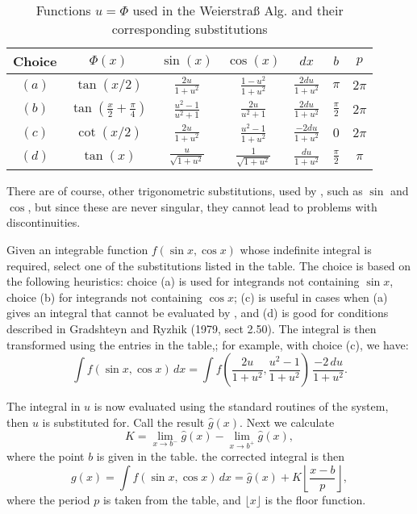 \begin{table}[htbp]
\begin{tabular}{|c|c|c|c|c|c|c|} \hline
Choice & $\Phi(x)$ & $\sin(x)$ & $\cos(x)$ & $dx$ & $b$ & $p$ \\ \hline
$(a)$ & $\tan(x/2)$ & $\frac{2u}{1+u^{2}}$ & $ \frac{1-u^{2}}{1+u^{2}}$ & $\frac{2du}{1+u^{2}}$ & $\pi$ & $2\pi$ \\ \hline
$(b)$ & $\tan(\frac{x}{2}+\frac{\pi}{4})$ & $\frac{u^{2}-1}{u^{2}+1}$ & $\frac{2u}{u^{2}+1} $ & $\frac{2du}{1+u^{2}}$ & $\frac{\pi}{2}$ & $2\pi$ \\ \hline
$(c)$ & $\cot(x/2)$ & $\frac{2u}{1+u^{2}}$ & $\frac{u^{2}-1}{1+u^{2}}$ & $\frac{-2du}{1+u^{2}}$ & $0$ & $2\pi$ \\ \hline
$(d)$ & $\tan(x)$ & $\frac{u}{\sqrt{1+u^{2}}}$ & $\frac{1}{\sqrt{1+u^{2}}}$ & $\frac{du}{1+u^{2}}$ & $\frac{\pi}{2}$ & $\pi$ \\ \hline
\end{tabular}
\caption{Functions $u=\Phi$ used in the Weierstra\ss{} Alg. and their corresponding substitutions}
\end{table}

There are of course, other trigonometric substitutions, used by \REDUCE, such as $\sin$ and $\cos$, but since these are never singular, they cannot lead to problems with discontinuities.

Given an integrable function $f(\sin x,\cos x)$ whose indefinite integral is required, select one of the substitutions listed in the table. The choice is based on the following heuristics: choice (a) is used for integrands not containing $\sin x$, choice (b) for integrands not containing $\cos x$; (c) is useful in cases when (a) gives an integral that cannot be evaluated by \REDUCE, and (d) is good for conditions described in Gradshteyn and Ryzhik (1979, sect 2.50). The integral is then transformed using the entries in the table,; for example, with choice (c), we have:
\[ \int f(\sin x,\cos x)\, dx = \int f\left(\frac{2u}{1+u^{2}},\frac{u^{2}-1}{1+u^{2}}\right)\,\frac{-2\,du}{1+u^{2}} . \]

The integral in $u$ is now evaluated using the standard routines of the system, then $u$ is substituted for. Call the result $\hat{g}(x)$. Next we calculate
 \[ K=\lim_{x \rightarrow b^{-}} \hat{g}(x) - \lim_{x \rightarrow b^{+}} \hat{g}(x), \]
where the point $b$ is given in the table. the corrected integral is then
\[ g(x)=\int f(\sin x,\cos x)\,dx = \hat{g}(x)+K\left\lfloor \frac{x-b}{p} \right\rfloor, \]
where the period $p$ is taken from the table, and $\lfloor x \rfloor$ is the floor function.

